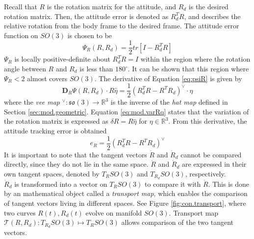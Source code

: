 Recall that $ R $ is the rotation matrix for the  attitude, and $ R_d $ is the desired rotation matrix. Then, the attitude error is denoted as $ R^T_dR $, and describes the relative rotation from the body frame to the desired frame. 
The  attitude error function on $ SO(3) $ is chosen to be 
\begin{equation}\label{eq:psiR}
\Psi_R(R,R_d)=\frac{1}{2}tr\left[I-R_d^TR\right]
\end{equation}
$ \Psi_R $ is locally positive-definite about $ R^T_dR=I $ within the region where the rotation angle between $ R $ and $ R_d $ is less than $ 180^\circ $. 
It can be shown that this region where $ \Psi_R<2 $ almost covers $ SO(3) $.
The derivative of Equation \ref{eq:psiR} is given by 
\begin{equation}\label{key}
\mathbf{D}_R\Psi(R,R_d)\cdot R\hat{\eta}=\frac{1}{2}(R^T_dR-R^TR_d)^\vee\cdot\eta
\end{equation}
where the \textit{vee map} $ ^\vee:\mathfrak{so}(3)\rightarrow\mathbb{R}^3 $ is the inverse of the \textit{hat map} defined in Section \ref{sec:mod.geometric}. 
Equation \ref{eq:mod.varRq} states that the variation of the rotation matrix is expressed as $ \delta R = R\hat{\eta} $ for $ \eta\in\mathbb{R}^3 $.
From this derivative, the attitude tracking error is obtained 
\begin{equation}\label{eq:con.eR}
e_R=\frac{1}{2}(R_d^TR-R^TR_d)^\vee
\end{equation}
It is important to note that the tangent vectors $ \dot{R} $ and $ \dot{R}_d $ cannot be compared directly, since they do not lie in the same space. $ \dot{R} $ and $ \dot{R}_d $ are expressed in their own tangent spaces, denoted by $ T_RSO(3)$ and $ T_{R_d}SO(3)$, respectively.\\
$ \dot{R}_d $ is transformed into a vector on $ T_RSO(3) $ to compare it with $ \dot{R} $. This is done by an mathematical object called a \textit{transport map}, which enables the comparison of tangent vectors living in different spaces. See Figure \ref{fig:con.transport}, where two curves $ R(t), R_d(t)$ evolve on manifold $ SO(3) $. Transport map $ \mathcal{T}(R,R_d):T_{R_d}SO(3)\mapsto T_RSO(3) $ allows comparison of the two tangent vectors.
